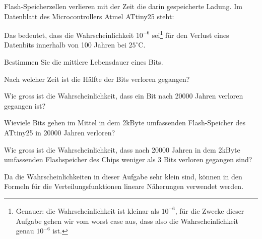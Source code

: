 Flash-Speicherzellen verlieren mit der Zeit die darin gespeicherte Ladung.
Im Datenblatt des Microcontrollers Atmel ATtiny25 steht:
\begin{center}
\end{center}
Das bedeutet, dass die
Wahrscheinlichkeit $10^{-6}$ sei\footnote{Genauer: die Wahrscheinlichkeit
ist kleinar als $10^{-6}$, für die Zwecke dieser Aufgabe gehen wir vom
worst case aus, dass also die Wahrscheinlichkeit genau $10^{-6}$ ist.}
für den Verlust eines Datenbits innerhalb
von 100 Jahren bei $25^\circ$C.
\begin{teilaufgaben}
\item Bestimmen Sie die mittlere Lebensdauer eines Bits.
\item Nach welcher Zeit ist die Hälfte der Bits verloren gegangen?
\item Wie gross ist die Wahrscheinlichkeit, dass ein Bit nach 20000
Jahren verloren gegangen ist?
\item Wieviele Bits gehen im Mittel in dem 2kByte umfassenden Flash-Speicher
des ATtiny25 in 20000 Jahren verloren?
\item Wie gross ist die Wahrscheinlichkeit, dass nach 20000 Jahren
in dem 2kByte umfassenden Flash\-speicher des Chips
weniger als 3 Bits verloren gegangen sind?
\end{teilaufgaben}

\begin{hinweis}
Da die Wahrscheinlichkeiten in dieser Aufgabe sehr klein sind, können
in den Formeln für die Verteilungsfunktionen lineare Näherungen
verwendet werden.
\end{hinweis}

